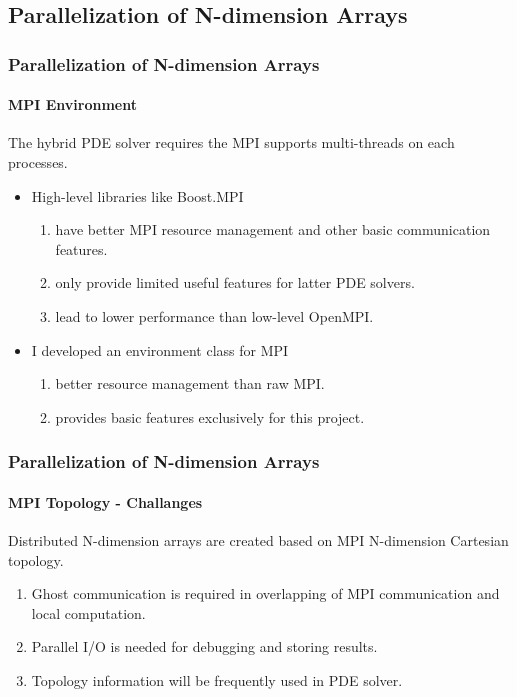 






\subsection{Parallelization of N-dimension Arrays}
\begin{frame}
  \frametitle{Parallelization of N-dimension Arrays}
  \framesubtitle{MPI Environment}
  \hspace*{1em}The hybrid PDE solver requires the MPI supports multi-threads on each processes.\vspace*{1em}
  \begin{itemize}
    \item High-level libraries like Boost.MPI  
    \begin{enumerate}
      \item have better MPI resource management and other basic communication features.
      \item only provide limited useful features for latter PDE solvers.
      \item lead to lower performance than low-level OpenMPI. \vspace*{1em}
    \end{enumerate}
    \item I developed an environment class for MPI 
    \begin{enumerate}
      \item better resource management than raw MPI.
      \item provides basic features exclusively for this project.
    \end{enumerate}
  \end{itemize}
  
  \vspace*{1em}\hspace*{1em}



\end{frame}


\begin{frame}
  \frametitle{Parallelization of N-dimension Arrays}
  \framesubtitle{MPI Topology - Challanges}
  
  Distributed N-dimension arrays are created based on MPI N-dimension Cartesian topology.
  \begin{enumerate}
    \item Ghost communication is required in overlapping of MPI communication and local computation.
    \item Parallel I/O is needed for debugging and storing results.
    \item Topology information will be frequently used in PDE solver.
  \end{enumerate}
\end{frame}


